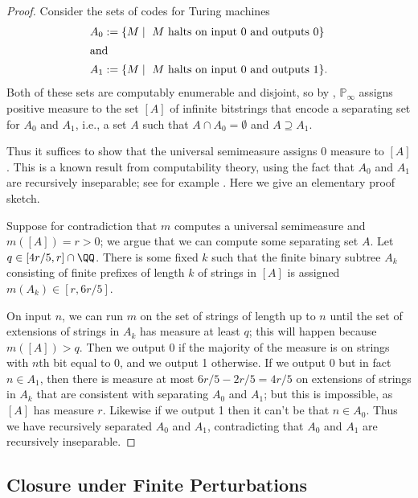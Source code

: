 \documentclass[authordate,onecolumn,noenvironments]{miri-tech-article}
\numberwithin{equation}{subsection}
\newcommand{\BelState}{\mathbb{P}}
\newcommand{\pt}{\BelState}
\begin{document}
\begin{proof}

Consider the sets of codes for Turing machines 
%
\begin{align*}
  A_0 &:= \{ M \mid \text{ $M$ halts on input 0 and outputs 0}\}\\
  \shortintertext{and}
  A_1 &:= \{ M \mid \text{ $M$ halts on input 0 and outputs 1}\}.
\end{align*}
%
Both of these sets are computably enumerable and disjoint, so by , $\pt_\infty$ assigns positive measure to the set $[A]$ of infinite bitstrings that encode a separating set for $A_0$ and $A_1$, i.e., a set $A$ such that $A\cap A_0 = \emptyset$ and $A\supseteq A_1$. 

Thus it suffices to show that the universal semimeasure assigns 0 measure to $[A]$.  This is a known result from computability theory, using the fact that $A_0$ and $A_1$ are recursively inseparable; see for example \cite{kuvcera2011demuth}. Here we give an elementary proof sketch.

Suppose for contradiction that $m$ computes a universal semimeasure and $m([A])= r >0$; we argue that we can compute some separating set $A$. Let $q \in [4r/5,r] \cap \QQ$. There is some fixed $k$ such that the finite binary subtree $A_k$ consisting of finite prefixes of length $k$ of strings in $[A]$  is assigned  $m(A_k) \in [r,6r/5]$. 

On input $n$, we can run $m$ on the set of strings of length up to $n$ until the set of extensions of strings in $A_k$ has measure at least $q$; this will happen because $m([A]) >q$. Then we output 0 if the majority of the measure is on strings with $n$th bit equal to 0, and we output 1 otherwise. If we output 0 but in fact $n \in A_1$, then there is measure at most $6r/5-2r/5 = 4r/5$ on extensions of strings in $A_k$ that are consistent with separating $A_0$ and $A_1$; but this is impossible, as $[A]$ has measure $r$. Likewise if we output 1 then it can't be that $n \in A_0$. Thus we have recursively separated $A_0$ and $A_1$, contradicting that $A_0$ and $A_1$ are recursively inseparable.

\end{proof}




\subsection{Closure under Finite Perturbations}\label{app:ifp}
\end{document}
